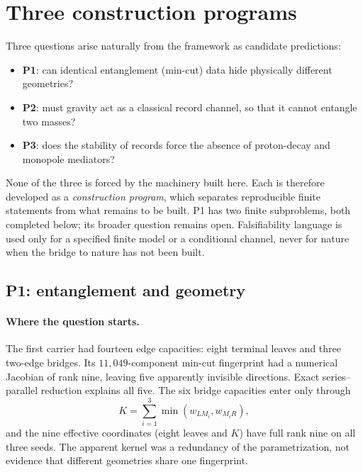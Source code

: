 \section{Three construction programs}\label{open-programs-from-the-three-published-predictions}

Three questions arise naturally from the framework as candidate predictions:
\begin{itemize}\tightlist
\item \textbf{P1}: can identical entanglement (min-cut) data hide physically different geometries?
\item \textbf{P2}: must gravity act as a classical record channel, so that it cannot entangle two masses?
\item \textbf{P3}: does the stability of records force the absence of proton-decay and monopole mediators?
\end{itemize}
None of the three is forced by the machinery built here. Each is therefore developed as a \emph{construction
program}, which separates reproducible finite statements from what remains to be built. P1 has two finite subproblems,
both completed below; its broader question remains open. Falsifiability language is used only for a specified finite
model or a conditional channel, never for nature when the bridge to nature has not been built.

\subsection{P1: entanglement and geometry}\label{the-entanglement-geometry-question-open-program}

\paragraph{Where the question starts.} The first carrier had fourteen edge capacities: eight terminal leaves and three
two-edge bridges. Its \(11{,}049\)-component min-cut fingerprint had a numerical Jacobian of rank nine, leaving five
apparently invisible directions. Exact series--parallel reduction explains all five. The six bridge capacities enter
only through
\[
K=\sum_{i=1}^{3}\min(w_{LM_i},w_{M_iR}),
\]
and the nine effective coordinates (eight leaves and \(K\)) have full rank nine on all three seeds. The apparent kernel
was a redundancy of the parametrization, not evidence that different geometries share one fingerprint.

